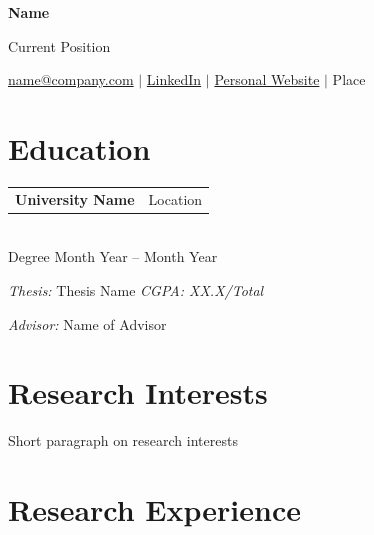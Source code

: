 \documentclass[10pt,letterpaper]{letter}
\makeatletter
\newcommand{\entryspace}{\vspace{0.38em}}
\newcommand{\cvheading}[2]{%
	\noindent
	\begin{tabular*}{\textwidth}{@{}p{0.74\textwidth}@{\extracolsep{\fill}}r@{}}
		\textbf{#1} & #2
	\end{tabular*}\\
}
\newcommand{\mediumsize}{\fontsize{11pt}{13pt}\selectfont}
\makeatother
\begin{document}
	\begin{center}
		{\LARGE\bfseries Name}

		\vspace{2pt}

		{\mediumsize Current Position}

		\vspace{3pt}

		\small
		\href{mailto:name@company.com}{name@company.com}
		\quad
		{\color{darkgray}$\vert$}
		\quad
		\href{https://www.example.com}{LinkedIn}
		\quad
		{\color{darkgray}$\vert$}
		\quad
		\href{https://www.example.com}{Personal Website}
		\quad
		{\color{darkgray}$\vert$}
		\quad
		Place
	\end{center}
	\vspace{-0.35em}

	\section*{Education}

	\cvheading{University Name}{Location}

	Degree
	\hfill Month Year -- Month Year

	\textit{Thesis:} Thesis Name
	\hfill \textit{CGPA: XX.X/Total}

	\textit{Advisor:} Name of Advisor

	\entryspace
	\section*{Research Interests}

	\begin{justify}
		Short paragraph on research interests
	\end{justify}

	\section*{Research Experience}
\end{document}
